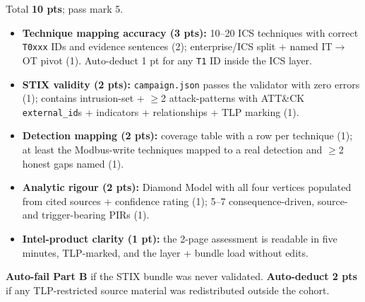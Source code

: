 \documentclass[11pt,a4paper]{article}
\begin{document}
\begin{rubricbox}
Total \textbf{10 pts}; pass mark 5.
\begin{itemize}[leftmargin=*, nosep]
  \item \textbf{Technique mapping accuracy (3 pts):} 10--20 ICS techniques with
        correct \texttt{T0xxx} IDs and evidence sentences (2); enterprise/ICS
        split + named IT$\to$OT pivot (1). Auto-deduct 1 pt for any \texttt{T1}
        ID inside the ICS layer.
  \item \textbf{STIX validity (2 pts):} \texttt{campaign.json} passes the
        validator with zero errors (1); contains intrusion-set + $\geq$2
        attack-patterns with ATT\&CK \texttt{external\_id}s + indicators +
        relationships + TLP marking (1).
  \item \textbf{Detection mapping (2 pts):} coverage table with a row per
        technique (1); at least the Modbus-write techniques mapped to a real
        detection and $\geq$2 honest gaps named (1).
  \item \textbf{Analytic rigour (2 pts):} Diamond Model with all four vertices
        populated from cited sources + confidence rating (1); 5--7
        consequence-driven, source- and trigger-bearing PIRs (1).
  \item \textbf{Intel-product clarity (1 pt):} the 2-page assessment is readable
        in five minutes, TLP-marked, and the layer + bundle load without edits.
\end{itemize}
\textbf{Auto-fail Part B} if the STIX bundle was never validated. \textbf{Auto-deduct
2 pts} if any TLP-restricted source material was redistributed outside the cohort.
\end{rubricbox}
\end{document}
